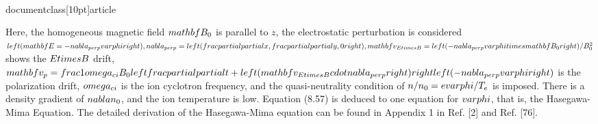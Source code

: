 \\documentclass[10pt]{article}
\begin{document}
{{{{{Here, the homogeneous magnetic field $\\mathbf{B}_{0}$ is parallel to $z$, the electrostatic perturbation is considered $\\left(\\mathbf{E}=-\\nabla_{\\perp} \\varphi\\right), \\nabla_{\\perp}=\\left(\\frac{\\partial}{\\partial x}, \\frac{\\partial}{\\partial y}, 0\\right), \\mathbf{v}_{E \\times B}=\\left(-\\nabla_{\\perp} \\varphi \\times \\mathbf{B}_{0}\\right) / B_{0}^{2}$ shows the $E \\times B$ drift, $\\mathbf{v}_{p}=\\frac{1}{\\omega_{c i} B_{0}}\\left\\{\\frac{\\partial}{\\partial t}+\\left(\\mathbf{v}_{E \\times B} \\cdot \\nabla_{\\perp}\\right)\\right\\}\\left(-\\nabla_{\\perp} \\varphi\\right)$ is the polarization drift, $\\omega_{c i}$ is the ion cyclotron frequency, and the quasi-neutrality condition of $n / n_{0}=e \\varphi / T_{e}$ is imposed. There is a density gradient of $\\nabla n_{0}$, and the ion temperature
is low. Equation (8.57) is deduced to one equation for $\\varphi$, that is, the Hasegawa-Mima Equation. The detailed derivation of the Hasegawa-Mima equation can be found in Appendix 1 in Ref. [2] and Ref. [76].

}}}}}
\end{document}
